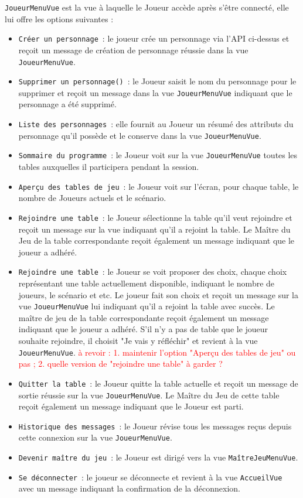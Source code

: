 \documentclass[11pt]{article}
\begin{document}
\texttt{JoueurMenuVue} est la vue à laquelle le Joueur accède après s'être connecté, elle lui offre les options suivantes :
\begin{itemize}[label=, font=\small]
    \item\texttt{Créer un personnage}~: le joueur crée un personnage via l'API ci-dessus et reçoit un message de création de personnage réussie dans la vue \texttt{JoueurMenuVue}.
    \item\texttt{Supprimer un personnage()}~: le Joueur saisit le nom du personnage pour le supprimer et reçoit un message dans la vue \texttt{JoueurMenuVue} indiquant que le personnage a été supprimé.
    \item\texttt{Liste des personnages}~: elle fournit au Joueur un résumé des attributs du personnage qu'il possède et le conserve dans la vue \texttt{JoueurMenuVue}.
    \item\texttt{Sommaire du programme}~: le Joueur voit sur la vue \texttt{JoueurMenuVue} toutes les tables auxquelles il participera pendant la session.
    \item\texttt{Aperçu des tables de jeu}~: le Joueur voit sur l'écran, pour chaque table, le nombre de Joueurs actuels et le scénario.
    \item\texttt{Rejoindre une table}~: le Joueur sélectionne la table qu'il veut rejoindre et reçoit un message sur la vue indiquant qu'il a rejoint la table. Le Maître du Jeu de la table correspondante reçoit également un message indiquant que le joueur a adhéré.
    \item\texttt{Rejoindre une table}~: le Joueur se voit proposer des choix, chaque choix représentant une table actuellement disponible, indiquant le nombre de joueurs, le scénario et etc. Le joueur fait son choix et reçoit un message sur la vue \texttt{JoueurMenuVue} lui indiquant qu'il a rejoint la table avec succès. Le maître de jeu de la table correspondante reçoit également un message indiquant que le joueur a adhéré. S'il n'y a pas de table que le joueur souhaite rejoindre, il choisit "Je vais y réfléchir" et revient à la vue \texttt{JoueurMenuVue}.
    \textcolor{red}{à revoir : 1. maintenir l'option "Aperçu des tables de jeu" ou pas ; 2. quelle version de "rejoindre une table" à garder ?  }
    \item\texttt{Quitter la table}~: le Joueur quitte la table actuelle et reçoit un message de sortie réussie sur la vue \texttt{JoueurMenuVue}. Le Maître du Jeu de cette table reçoit également un message indiquant que le Joueur est parti.
    \item\texttt{Historique des messages}~: le Joueur révise tous les messages reçus depuis cette connexion sur la vue \texttt{JoueurMenuVue}.
    \item\texttt{Devenir maître du jeu}~: le Joueur est dirigé vers la vue \texttt{MaîtreJeuMenuVue}.   
    \item\texttt{Se déconnecter}~: le joueur se déconnecte et revient à la vue \texttt{AccueilVue} avec un message indiquant la confirmation de la déconnexion.
\end{itemize}
\end{document}
